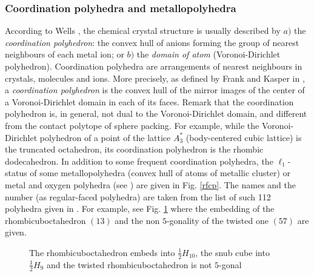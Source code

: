 \subsubsection{Coordination polyhedra and metallopolyhedra}
According to {\sc Wells} \cite{w84}, the chemical crystal structure is usually described by
$a)$ the {\em coordination polyhedron}:
the convex hull of anions forming the group of nearest neighbours of each metal ion;
or $b)$ the {\em domain of atom} (Voronoi-Dirichlet polyhedron).
Coordination polyhedra are arrangements of nearest neighbours in crystals, molecules and ions.
More precisely, as defined by {\sc Frank and Kasper} in \cite{fk58}, a {\em coordination 
polyhedron}
is the convex hull of the mirror images of the center of a Voronoi-Dirichlet domain in each of its
faces. Remark that the coordination polyhedron is, in general, 
not dual to the Voronoi-Dirichlet
domain, and different from the contact polytope of sphere packing.
For example, while the Voronoi-Dirichlet 
polyhedron of a point of the lattice $A_3^*$ 
(body-centered cubic lattice) is the truncated octahedron, its coordination polyhedron is the rhombic
dodecahedron. 
In addition to some frequent coordination polyhedra, the $\ell_1$-status of some
metallopolyhedra (convex hull of atoms of metallic cluster) or metal and
oxygen polyhedra (see \cite{ddmp93,king,thim,w84}) %
are given in Fig. \ref{rfcp}.
The names and the number (as regular-faced polyhedra) are taken
from the list of such 112 polyhedra given in \cite{b71,Za}. For example, see Fig. \ref{twisted}
where the embedding of the rhombicuboctahedron $(13)$ and the non $5$-gonality of 
the twisted one $(57)$ are given.

\begin{figure}[htb]
\begin{center}
\caption{The rhombicuboctahedron embeds into $\frac{1}{2}H_{10}$, the snub cube
into $\frac{1}{2}H_{9}$ and the twisted rhombicuboctahedron is not $5$-gonal}\label{twisted}
\end{center}
\end{figure}

